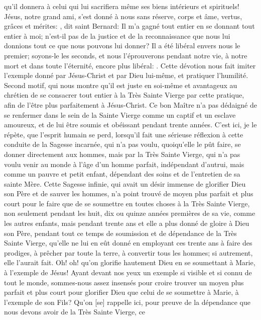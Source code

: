qu'il donnera à celui qui lui sacrifiera même ses biens intérieurs et spirituels!
 Jésus, notre grand ami, s'est donné à nous sans réserve, corps et âme, vertus, grâces et mérites: , dit saint Bernard: Il m'a gagné tout entier en se donnant tout entier à moi; n'est-il pas de la
justice et de la reconnaissance que nous lui donnions tout ce que nous pouvons lui donner? Il a été libéral envers
nous le premier; soyons-le les seconds, et nous l'éprouverons pendant notre vie, à notre mort et dans toute
l'éternité, encore plus libéral: .
Cette dévotion nous fait imiter l'exemple
donné par Jésus-Christ et par Dieu lui-même,
et pratiquer l'humilité.
 Second motif, qui nous montre qu'il est juste en soi-même et avantageux au chrétien de se consacrer tout
entier à la Très Sainte Vierge par cette pratique, afin de l'être plus parfaitement à Jésus-Christ.
Ce bon Maître n'a pas dédaigné de se renfermer dans le sein de la Sainte Vierge comme un captif et un esclave
amoureux, et de lui être soumis et obéissant pendant trente années. C'est ici, je le répète, que l'esprit humain se
perd, lorsqu'il fait une sérieuse réflexion à cette conduite de la Sagesse incarnée, qui n'a pas voulu, quoiqu'elle le
pût faire, se donner directement aux hommes, mais par la Très Sainte Vierge, qui n'a pas voulu venir au monde à
l'âge d'un homme parfait, indépendant d'autrui, mais comme un pauvre et petit enfant, dépendant des soins et de
l'entretien de sa sainte Mère. Cette Sagesse infinie, qui avait un désir immense de glorifier Dieu son Père et de
sauver les hommes, n'a point trouvé de moyen plus parfait et plus court pour le faire que de se soumettre en
toutes choses à la Très Sainte Vierge, non seulement pendant les huit, dix ou quinze années premières de sa vie,
comme les autres enfants, mais pendant trente ans et elle a plus donné de gloire à Dieu son Père, pendant tout ce
temps de soumission et de dépendance de la Très Sainte Vierge, qu'elle ne lui en eût donné en employant ces
trente ans à faire des prodiges, à prêcher par toute la terre, à convertir tous les hommes; si autrement, elle l'aurait
fait. Oh! oh! qu'on glorifie hautement Dieu en se soumettant à Marie, à l'exemple de Jésus!
Ayant devant nos yeux un exemple si visible et si connu de tout le monde, sommes-nous assez insensés pour
croire trouver un moyen plus parfait et plus court pour glorifier Dieu que celui de se soumettre à Marie, à l'exemple
de son Fils?
 Qu'on [se] rappelle ici, pour preuve de la dépendance que nous devons avoir de la Très Sainte Vierge, ce
